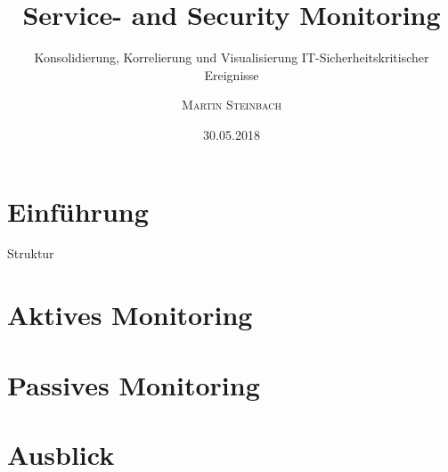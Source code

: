 \documentclass[10pt]{beamer} %
\title{Service- and Security Monitoring}
\subtitle{Konsolidierung, Korrelierung und Visualisierung
IT-Sicherheitskritischer Ereignisse\\}
\author{\textsc{Martin Steinbach}}
\date{30.05.2018}
\institute{Universität Rostock, Institut für Informatik\\\\}
\begin{document}
\begin{frame}%
  \titlepage
\end{frame}




\section{Einführung}
\begin{frame}{Struktur}
\tableofcontents[pausesections]
\end{frame}



\section{Aktives Monitoring}
\frame{\tableofcontents[currentsection]}

\section{Passives Monitoring}
\frame{\tableofcontents[currentsection]}


\section{Ausblick}
\frame{\tableofcontents[currentsection]}

\end{document}
